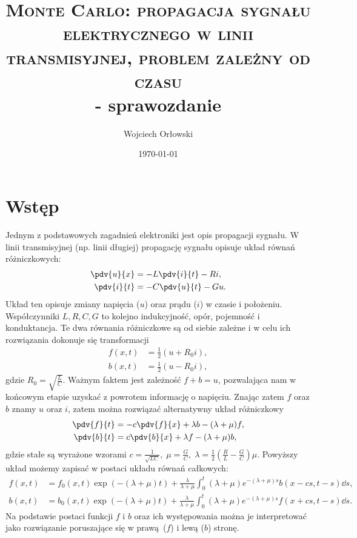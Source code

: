\documentclass[a4paper, 12pt]{article}
\author{Wojciech Orłowski}
\date{\today}
\title{\textsc{Monte Carlo: propagacja sygnału elektrycznego w linii transmisyjnej, problem zależny od czasu}\\ - sprawozdanie}
\begin{document}
	\maketitle
	
	\section*{Wstęp}
	
	Jednym z podstawowych zagadnień elektroniki jest opis propagacji sygnału. 
	W linii transmisyjnej (np. linii długiej) propagację sygnału opisuje układ równań różniczkowych:
	\begin{align}
		\pdv{u}{x}	&= -L\pdv{i}{t} - Ri, \\
		\pdv{i}{t}  &= -C\pdv{u}{t} - Gu.
	\end{align}	
	Układ ten opisuje zmiany napięcia ($u$) oraz prądu ($i$) w czasie i położeniu. Współczynniki $L,R,C,G$ to kolejno indukcyjność, opór, pojemność i konduktancja.
	Te dwa równania różniczkowe są od siebie zależne i w celu ich rozwiązania dokonuje się transformacji
	\begin{align}
		f(x,t) &= \frac{1}{2} (u + R_0 i), \\
		b(x,t) &= \frac{1}{2} (u - R_0 i) ,
	\end{align}
	gdzie $R_0 = \sqrt{\frac{L}{C}}$. Ważnym faktem jest zależność $f+b = u$, pozwalająca nam w końcowym etapie uzyskać z powrotem informację o napięciu. Znając zatem $f$ oraz $b$ znamy $u$ oraz $i$, zatem można rozwiązać alternatywny układ różniczkowy
	\begin{align}
		\pdv{f}{t} &= -c\pdv{f}{x} + \lambda b - (\lambda + \mu)f, \\
		\pdv{b}{t} &= c\pdv{b}{x} + \lambda f - (\lambda + \mu)b, 
	\end{align}
	gdzie stałe są wyrażone wzorami $c = \frac{1}{\sqrt{LC}},\;\mu = \frac{G}{C},\;\lambda = \frac{1}{2}\left(\frac{R}{L} - \frac{G}{C}\right) \mu.$
	Powyższy układ możemy zapisać w postaci układu równań całkowych:
	\begin{align}
		f(x,t) &= f_0(x,t) \exp(-(\lambda + \mu)t)+\frac{\lambda}{\lambda + \mu} \int_{0}^{t} (\lambda + \mu)e^{-(\lambda+\mu)s} b(x-cs,t-s)\dd s, \\
		b(x,t) &= b_0(x,t) \exp(-(\lambda + \mu)t)+\frac{\lambda}{\lambda + \mu} \int_{0}^{t} (\lambda + \mu)e^{-(\lambda+\mu)s} f(x+cs,t-s)\dd s.
	\end{align}
	Na podstawie postaci funkcji $f$ i $b$ oraz ich występowania można je interpretować jako rozwiązanie poruszające się w prawą ($f$) i lewą ($b$) stronę.
\end{document}

